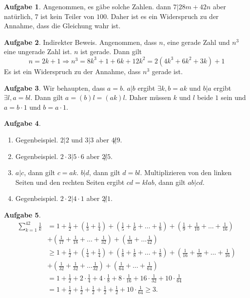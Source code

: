 \documentclass{article}
\theoremstyle{definition}
\newtheorem{ub}{Aufgabe}
\begin{document}
\begin{ub}
	Angenommen, es g\"abe solche Zahlen. dann $ 7 | 28m + 42n $ aber nat\"urlich, $ 7 $ ist kein Teiler von 
	$ 100 $. Daher ist es ein Widerspruch zu der Annahme, dass die Gleichung wahr ist. 
\end{ub}
\begin{ub}
	Indirekter Beweis. Angenommen, dass $ n $, eine gerade Zahl und $ n^3 $ eine ungerade Zahl ist.
	$ n $ ist gerade. Dann gilt
	\[ 
	n = 2k + 1 \Rightarrow n^3 = 8k^3 + 1 + 6k + 12k^2 = 2(4k^3 + 6k^2 + 3k) + 1
	 \]
	Es ist ein Widerspruch zu der Annahme, dass $ n^3 $ gerade ist.
\end{ub}
\begin{ub}
	Wir behaupten, dass $ a=b $. $ a|b $ ergibt $ \exists k, b =ak $ und $ b|a $ ergibt $ \exists l, a=bl $. Dann gilt $ a = (b)l = (ak)l $. Daher m\"ussen $ k $ und $ l $ beide $ 1 $ sein und $ a = b\cdot 1 $ und $ b = a \cdot 1 $.
\end{ub}
\begin{ub}
	\begin{enumerate}
		\item 
		Gegenbeispiel. $ 2|2 $ und $ 3|3 $ aber $ 4 \not| 9 $.
		\item 
		Gegenbeispiel. $ 2 \cdot 3 | 5 \cdot 6 $ aber $ 2 \not | 5 $.
		\item $ a|c $, dann gilt $ c=ak $. $ b|d $, dann gilt $ d = bl $. Multiplizieren von den linken Seiten und den rechten Seiten ergibt $ cd = klab $, dann gilt $ ab|cd $.
		\item 
		Gegenbeispiel. $ 2 \cdot 2 | 4 \cdot 1 $ aber $ 2 \not | 1 $.
	\end{enumerate}
\end{ub}
\begin{ub}
	\begin{align*}
		\sum\limits_{k=1}^{42} \frac{1}{k} & = 1 + \frac{1}{2} + (\frac{1}{3} + \frac{1}{4})
		+ ( \frac{1}{5} + \frac{1}{6} + \ldots + \frac{1}{8} ) + (\frac{1}{9} + \frac{1}{10} + \ldots +
		\frac{1}{16}) \\
		& + (\frac{1}{17} + \frac{1}{18} + \ldots + \frac{1}{32}) + (\frac{1}{33} + \ldots \frac{1}{42}) \\
		& \geq 1+ \frac{1}{2} + (\frac{1}{4} + \frac{1}{4}) + (\frac{1}{8} + \frac{1}{8} + \ldots + \frac{1}{8}) + (\frac{1}{16} + \frac{1}{16} + \ldots + \frac{1}{16}) \\
		& + (\frac{1}{32} + \frac{1}{32} + \ldots \frac{1}{32}) + (\frac{1}{64} + \ldots + \frac{1}{64}) \\
		& = 1 + \frac{1}{2} + 2 \cdot \frac{1}{4} + 4\cdot\frac{1}{8} + 8\cdot\frac{1}{16} + 16\cdot\frac{1}{32} + 10\cdot\frac{1}{64} \\
		& = 1 + \frac{1}{2} + \frac{1}{2} + \frac{1}{2} + \frac{1}{2} + \frac{1}{2} + 10\cdot\frac{1}{64}
		\geq 3.
	\end{align*}
\end{ub}
\end{document}
